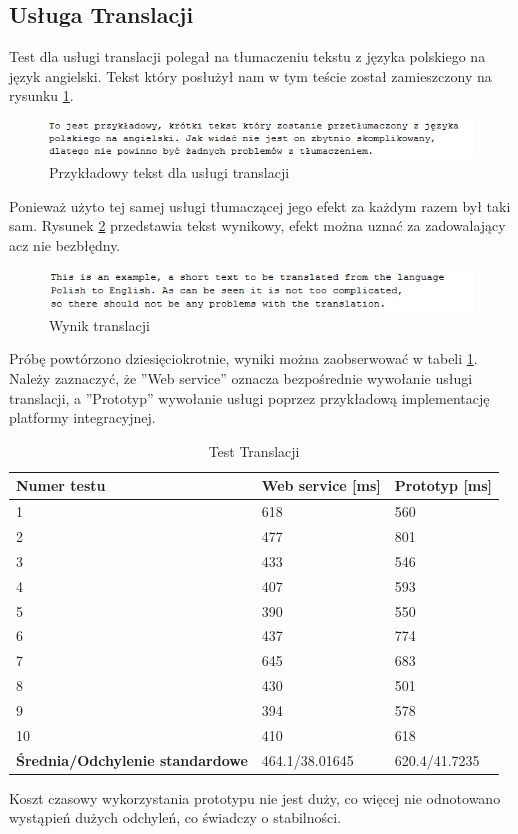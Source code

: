 \subsection{Usługa Translacji}
Test dla usługi translacji polegał na tłumaczeniu tekstu z języka polskiego na język angielski. Tekst który posłużył nam w tym teście został zamieszczony na rysunku \ref{fig:translatorExample}.
\begin{figure}[!h]
\centering
\includegraphics[scale=0.9]{translatorExample.png}
\caption{Przykładowy tekst dla usługi translacji}\label{fig:translatorExample}
\end{figure}
Ponieważ użyto tej samej usługi tłumaczącej jego efekt za każdym razem był taki sam. Rysunek \ref{fig:translatorResult} przedstawia tekst wynikowy, efekt można uznać za zadowalający acz nie bezbłędny. 
\begin{figure}[!h]
\centering
\includegraphics[scale=0.9]{translatorResult.png}
\caption{Wynik translacji}\label{fig:translatorResult}
\end{figure}

Próbę powtórzono dziesięciokrotnie, wyniki można zaobserwować w tabeli \ref{tab:translacja}. Należy zaznaczyć, że ''Web service'' oznacza bezpośrednie wywołanie usługi translacji, a ''Prototyp'' wywołanie usługi poprzez przykładową implementację platformy integracyjnej.

\begin{center}
	\begin{table}[h]
	\centering
	\begin{tabular}{| l | l | l |}	
		\hline
		\textbf{Numer testu} & \textbf{Web service [ms]} & \textbf{Prototyp [ms]} \\ \hline
		1 & 618 & 560\\ \hline
		2 & 477 & 801\\ \hline
		3 & 433 & 546\\ \hline
		4 & 407 & 593\\ \hline
		5 & 390 & 550\\ \hline
		6 & 437 & 774\\ \hline
		7 & 645 & 683\\ \hline
		8 & 430 & 501\\ \hline
		9 & 394 & 578\\ \hline
		10 & 410 & 618\\ \hline
		\textbf{Średnia/Odchylenie standardowe} & 464.1/38.01645 & 620.4/41.7235\\ 
		\hline
	\end{tabular}
	\caption{Test Translacji}
	\label{tab:translacja}
	\end{table}
\end{center}
Koszt czasowy wykorzystania prototypu nie jest duży, co więcej nie odnotowano wystąpień dużych odchyleń, co świadczy o stabilności.

